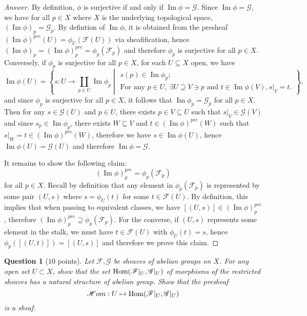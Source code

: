 \documentclass[12pt]{amsart}
\newcommand{\Ima}{\operatorname{Im}}
\newtheorem{question}{Question}
\begin{document}
\begin{proof}
    [Answer] By definition, $\phi $ is surjective if and only if $\Ima\phi =\mathscr{G} $. Since $\Ima\phi =\mathscr{G} $, we have for all $p\in X$ where $X$ is the underlying topological space, $(\Ima\phi )_p =\mathscr{G}_p $. By defintion of $\Ima\phi $, it is obtained from the presheaf $(\Ima\phi )^{pre} (U)=\phi_U (\mathscr{F} (U))$ via sheafification, hence $(\Ima\phi )_p =(\Ima\phi )^{pre}_p =\phi_p (\mathscr{F}_p )$ and therefore $\phi_p $ is surjective for all $p\in X$. Conversely, if $\phi_p $ is surjective for all $p\in X$, for each $U\subseteq X$ open, we have \[\Ima\phi (U)=\left\{s\colon U\to\displaystyle{\coprod_{p\in U}\Ima\phi_p }\middle\vert\begin{array}{l} s(p)\in\Ima\phi_p ;\\\text{For any }p\in U,\ \exists U\supseteq V\ni p\text{ and } t\in\Ima\phi (V), s\vert_V =t.\end{array}\right\},\]and since $\phi_p $ is surjective for all $p\in X$, it follows that $\Ima\phi_p =\mathscr{G}_p $ for all $p\in X$. Then for any $s\in\mathscr{G} (U)$ and $p\in U$, there exists $p\in V\subseteq U$ such that $s\vert_V\in\mathscr{G} (V)$ and since $s_p\in\Ima\phi_p $, there exists $W\subseteq V$ and $t\in (\Ima\phi )^{pre} (W)$ such that $s\vert_W =t\in (\Ima\phi )^{pre} (W)$, therefore we have $s\in\Ima\phi (U)$, hence $\Ima\phi (U)=\mathscr{G} (U)$ and therefore $\Ima\phi =\mathscr{G} $.

    It remains to show the following claim:
    \[
    (\Ima\phi )^{pre}_p =\phi_p (\mathscr{F}_p )
    \]
    for all $p\in X$. Recall by definition that any element in $\phi_p (\mathscr{F}_p )$ is represented by some pair $(U,s)$ where $s=\phi_U (t)$ for some $t\in\mathscr{F} (U)$. By definition, this implies that when passing to equivalent classes, we have $[(U,s)]\in (\Ima\phi )_p^{pre} $, therefore $(\Ima\phi )^{pre}_p\supseteq\phi_p (\mathscr{F}_p )$. For the converse, if $(U,s)$ represents some element in the stalk, we must have $t\in\mathscr{F} (U)$ with $\phi_U (t)=s$, hence $\phi_p ([(U,t)])=[(U,s)]$ and therefore we prove this claim.
\end{proof}

\begin{question}[$10$ points]
Let $ \mathscr F, \mathscr G$ be sheaves of abelian groups on $X$. For any open set $U \subset X$, show that the set ${\rm Hom}(\mathscr{F}|_U, \mathscr{G}|_U)$ of morphisms of the restricted sheaves has a natural structure of abelian group. Show that the presheaf
\[
{\mathscr H}om: U \mapsto {\rm Hom}(\mathscr{F}|_U, \mathscr{G}|_U)
\] is a sheaf.

\end{question}
\end{document}
